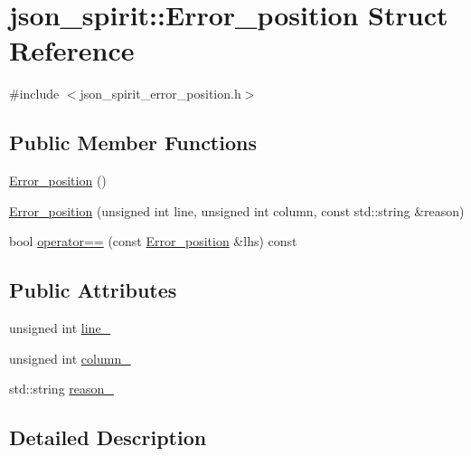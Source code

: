 \hypertarget{structjson__spirit_1_1_error__position}{}\section{json\+\_\+spirit\+:\+:Error\+\_\+position Struct Reference}
\label{structjson__spirit_1_1_error__position}


{\ttfamily \#include $<$json\+\_\+spirit\+\_\+error\+\_\+position.\+h$>$}

\subsection*{Public Member Functions}
\begin{DoxyCompactItemize}
\item 
\hyperlink{structjson__spirit_1_1_error__position_ab3f7e501e1fd0911aca3b6dab6f0fcab}{Error\+\_\+position} ()
\item 
\hyperlink{structjson__spirit_1_1_error__position_aaba601f740e35d100d50865b51f4cb25}{Error\+\_\+position} (unsigned int line, unsigned int column, const std\+::string \&reason)
\item 
bool \hyperlink{structjson__spirit_1_1_error__position_a4479ea47cd50288c8d688dba3f66b623}{operator==} (const \hyperlink{structjson__spirit_1_1_error__position}{Error\+\_\+position} \&lhs) const 
\end{DoxyCompactItemize}
\subsection*{Public Attributes}
\begin{DoxyCompactItemize}
\item 
unsigned int \hyperlink{structjson__spirit_1_1_error__position_abab231b427a34db24a70da8b552e57f1}{line\+\_\+}
\item 
unsigned int \hyperlink{structjson__spirit_1_1_error__position_a4d91168f6a7de23c3bf3c0cd7c0f2d1f}{column\+\_\+}
\item 
std\+::string \hyperlink{structjson__spirit_1_1_error__position_a3012abfa6a31d6fe57a3699093361fc2}{reason\+\_\+}
\end{DoxyCompactItemize}


\subsection{Detailed Description}


